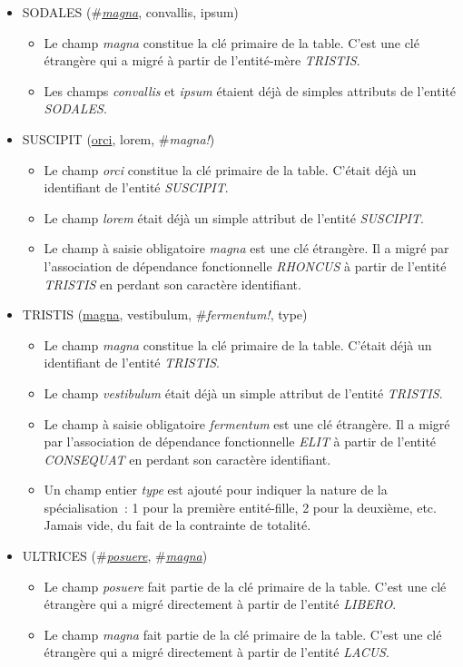\documentclass[a4paper]{article}
\newcommand{\relat}[1]{\textsc{#1}}
\newcommand{\attr}[1]{#1}
\newcommand{\prim}[1]{\uline{#1}}
\newcommand{\foreign}[1]{\#\textsl{#1}}
\begin{document}
\begin{itemize}
  \item \relat{SODALES} (\foreign{\prim{magna}}, \attr{convallis}, \attr{ipsum})
  \begin{itemize}
    \item Le champ \emph{magna} constitue la clé primaire de la table. C'est une clé étrangère qui a migré à partir de l'entité-mère \emph{TRISTIS}.
    \item Les champs \emph{convallis} et \emph{ipsum} étaient déjà de simples attributs de l'entité \emph{SODALES}.
  \end{itemize}

  \item \relat{SUSCIPIT} (\prim{orci}, \attr{lorem}, \foreign{magna!})
  \begin{itemize}
    \item Le champ \emph{orci} constitue la clé primaire de la table. C'était déjà un identifiant de l'entité \emph{SUSCIPIT}.
    \item Le champ \emph{lorem} était déjà un simple attribut de l'entité \emph{SUSCIPIT}.
    \item Le champ à saisie obligatoire \emph{magna} est une clé étrangère. Il a migré par l'association de dépendance fonctionnelle \emph{RHONCUS} à partir de l'entité \emph{TRISTIS} en perdant son caractère identifiant.
  \end{itemize}

  \item \relat{TRISTIS} (\prim{magna}, \attr{vestibulum}, \foreign{fermentum!}, \attr{type})
  \begin{itemize}
    \item Le champ \emph{magna} constitue la clé primaire de la table. C'était déjà un identifiant de l'entité \emph{TRISTIS}.
    \item Le champ \emph{vestibulum} était déjà un simple attribut de l'entité \emph{TRISTIS}.
    \item Le champ à saisie obligatoire \emph{fermentum} est une clé étrangère. Il a migré par l'association de dépendance fonctionnelle \emph{ELIT} à partir de l'entité \emph{CONSEQUAT} en perdant son caractère identifiant.
    \item Un champ entier \emph{type} est ajouté pour indiquer la nature de la spécialisation : 1 pour la première entité-fille, 2 pour la deuxième, etc. Jamais vide, du fait de la contrainte de totalité.
  \end{itemize}

  \item \relat{ULTRICES} (\foreign{\prim{posuere}}, \foreign{\prim{magna}})
  \begin{itemize}
    \item Le champ \emph{posuere} fait partie de la clé primaire de la table. C'est une clé étrangère qui a migré directement à partir de l'entité \emph{LIBERO}.
    \item Le champ \emph{magna} fait partie de la clé primaire de la table. C'est une clé étrangère qui a migré directement à partir de l'entité \emph{LACUS}.
  \end{itemize}

\end{itemize}
\end{document}
